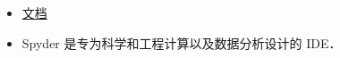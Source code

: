 
\begin{issues}
\issueDraft
\end{issues}

\begin{itemize}
\item \href{https://docs.spyder-ide.org/current/}{文档}
\item Spyder 是专为科学和工程计算以及数据分析设计的 IDE．
\end{itemize}
